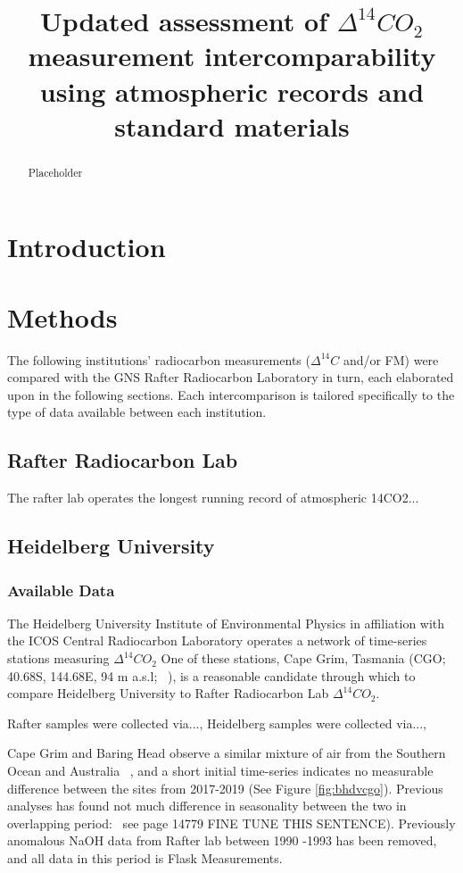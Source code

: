 \documentclass{article}
\title{Updated assessment of ${\Delta^{14}CO_{2}}$ measurement intercomparability using atmospheric records and standard materials}
\begin{document}
\maketitle


\newpage
\begin{abstract}
Placeholder
\end{abstract}


\newpage
\section{Introduction}


\newpage
\section{Methods}
The following institutions' radiocarbon measurements (${\Delta^{14}C}$ and/or FM) 
were compared with the GNS Rafter Radiocarbon Laboratory in turn, each elaborated upon in the following sections. Each intercomparison is tailored specifically to the type of data available between each institution. 
\subsection{Rafter Radiocarbon Lab}
The rafter lab operates the longest running record of atmospheric 14CO2...
\subsection{Heidelberg University}
\subsubsection{Available Data}
The Heidelberg University Institute of Environmental Physics in affiliation with the ICOS Central Radiocarbon Laboratory operates a network of time-series stations measuring ${\Delta^{14}CO_{2}}$
One of these stations, Cape Grim, Tasmania (CGO; 40.68S, 144.68E, 94 m a.s.l; ~\cite{levin2010}), is a reasonable candidate through which to compare Heidelberg University to Rafter Radiocarbon Lab ${\Delta^{14}CO_{2}}$. 

Rafter samples were collected via..., Heidelberg samples were collected via...,

Cape Grim and Baring Head observe a similar mixture of air from the Southern Ocean and Australia ~\cite{ziehn2014}, and a short initial time-series indicates no measurable difference between the sites from 2017-2019 (See Figure \ref{fig:bhdvcgo}). 
Previous analyses has found not much difference in seasonality between the two in overlapping period:~\cite{turnbull2017} see page 14779 FINE TUNE THIS SENTENCE). 
Previously anomalous NaOH data from Rafter lab between 1990 -1993 has been removed, and all data in this period is Flask Measurements.
\end{document}
